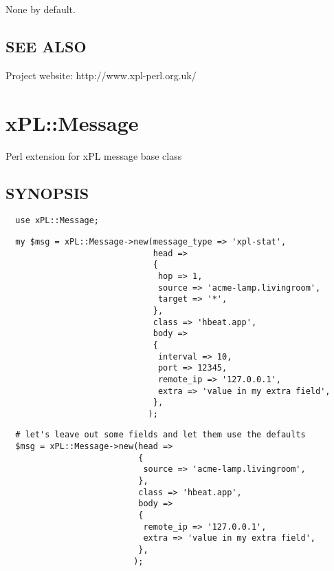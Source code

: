 \documentclass[12pt,a4paper]{article}
\begin{document}
None by default.

\subsection*{SEE ALSO\label{xPL::Listener_SEE_ALSO}}


Project website: http://www.xpl-perl.org.uk/

\newpage
\section{xPL::Message\label{xPL::Message}}


Perl extension for xPL message base class

\subsection*{SYNOPSIS\label{xPL::Message_SYNOPSIS}}
\begin{verbatim}
  use xPL::Message;
\end{verbatim}
\begin{verbatim}
  my $msg = xPL::Message->new(message_type => 'xpl-stat',
                              head =>
                              {
                               hop => 1,
                               source => 'acme-lamp.livingroom',
                               target => '*',
                              },
                              class => 'hbeat.app',
                              body =>
                              {
                               interval => 10,
                               port => 12345,
                               remote_ip => '127.0.0.1',
                               extra => 'value in my extra field',
                              },
                             );
\end{verbatim}
\begin{verbatim}
  # let's leave out some fields and let them use the defaults
  $msg = xPL::Message->new(head =>
                           {
                            source => 'acme-lamp.livingroom',
                           },
                           class => 'hbeat.app',
                           body =>
                           {
                            remote_ip => '127.0.0.1',
                            extra => 'value in my extra field',
                           },
                          );
\end{verbatim}
\end{document}

